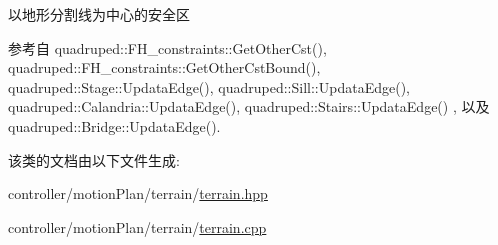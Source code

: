 以地形分割线为中心的安全区 



参考自 quadruped\+::\+F\+H\+\_\+constraints\+::\+Get\+Other\+Cst(), quadruped\+::\+F\+H\+\_\+constraints\+::\+Get\+Other\+Cst\+Bound(), quadruped\+::\+Stage\+::\+Updata\+Edge(), quadruped\+::\+Sill\+::\+Updata\+Edge(), quadruped\+::\+Calandria\+::\+Updata\+Edge(), quadruped\+::\+Stairs\+::\+Updata\+Edge() , 以及 quadruped\+::\+Bridge\+::\+Updata\+Edge().



该类的文档由以下文件生成\+:\begin{DoxyCompactItemize}
\item 
controller/motion\+Plan/terrain/\hyperlink{terrain_8hpp}{terrain.\+hpp}\item 
controller/motion\+Plan/terrain/\hyperlink{terrain_8cpp}{terrain.\+cpp}\end{DoxyCompactItemize}
